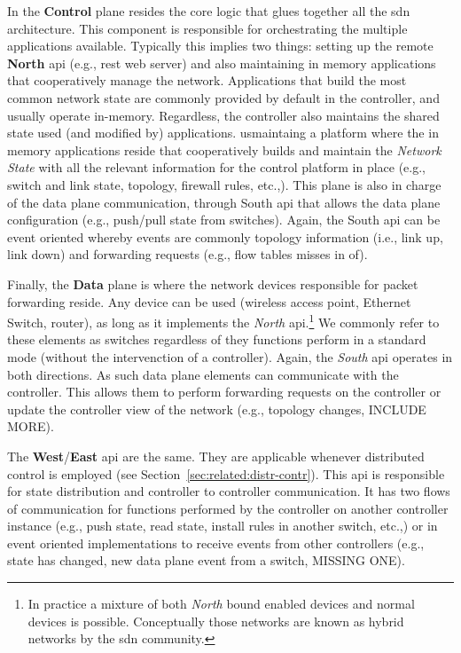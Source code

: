 In the \textbf{Control} plane resides the core logic that glues together all the \gls{sdn} architecture. This component is responsible for orchestrating the multiple applications available. Typically this implies two things: setting up the remote \textbf{North} \gls{api} (e.g., \gls{rest} web server) and also  maintaining in memory applications that cooperatively manage the network. Applications that build the most common network state are commonly provided by default in the controller, and usually operate in-memory. 
Regardless, the controller also maintains the shared state used (and modified by) applications. usmaintaing a platform where the in memory applications reside that cooperatively builds and maintain the \emph{Network State} with all the relevant information for the control platform in place (e.g., switch and link state,  topology, firewall rules, etc.,).  
This plane  is also in charge of the data plane communication, through South \gls{api}  that allows the data plane configuration (e.g., push/pull state from switches). Again, the South  \gls{api} can be event oriented whereby events are commonly topology information (i.e., link up, link down) and forwarding requests (e.g., flow tables misses in \gls{of}). 

Finally, the \textbf{Data} plane is where the network devices responsible for packet forwarding reside. Any device can be used (wireless access point, Ethernet Switch, router), as long as it implements the \emph{North} \gls{api}.\footnote{In practice a mixture of both \emph{North} bound enabled devices and normal devices is possible. Conceptually those networks are known as hybrid networks by the \gls{sdn} community.} We commonly refer to these elements as switches regardless  of they  functions perform in a standard mode (without the intervenction of a controller). 
Again, the \emph{South}  \gls{api}  operates in both directions. As such data plane elements can communicate with the controller. This allows them to perform forwarding requests on the controller or  update the controller view of the network (e.g., topology changes, INCLUDE MORE). 

The \textbf{West}/\textbf{East} \gls{api} are the same. They are applicable whenever  distributed control is employed (see Section~\ref{sec:related:distr-contr}). This \gls{api} is responsible for state distribution and controller to controller communication. It has two flows of communication for functions performed by the controller on another controller instance (e.g., push state, read state, install rules in another switch, etc.,) or in event oriented  implementations to receive events from other controllers (e.g., state has changed, new data plane event from a switch, MISSING ONE). 


